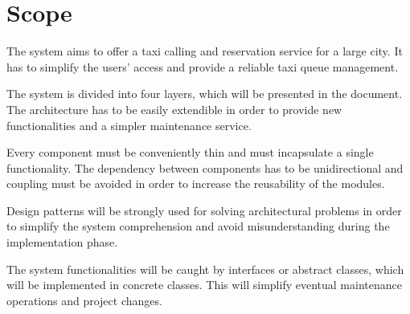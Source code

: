 \section{Scope}
\label{sec:scope}

The system aims to offer a taxi calling and reservation service for a large city. It has to simplify the users' access and provide a reliable taxi queue management.

The system is divided into four layers, which will be presented in the document. The architecture has to be easily extendible in order to provide new functionalities and a simpler maintenance service.

 Every component must be conveniently thin and must incapsulate a single functionality. The dependency between components has to be unidirectional and coupling must be avoided in order to increase the reusability of the modules.

 Design patterns will be strongly used for solving architectural problems in order to simplify the system comprehension and avoid misunderstanding during the implementation phase.

 The system functionalities will be caught by interfaces or abstract classes, which will be implemented in concrete classes. This will simplify eventual maintenance operations and project changes.
